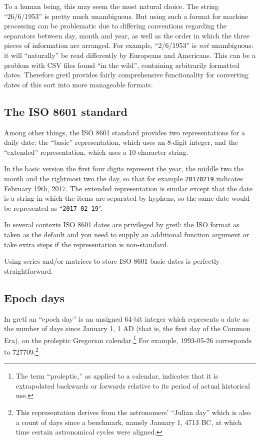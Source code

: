 To a human being, this may seem the most natural choice.  The string
``26/6/1953'' is pretty much unambiguous. But using such a format for
machine processing can be problematic due to differing conventions
regarding the separators between day, month and year, as well as the
order in which the three pieces of information are arranged.  For
example, ``2/6/1953'' is \textit{not} unambiguous: it will
``naturally'' be read differently by Europeans and Americans. This can
be a problem with CSV files found ``in the wild'', containing
arbitrarily formatted dates. Therefore gretl provides fairly
comprehensive functionality for converting dates of this sort into
more manageable formats.

\subsection{The ISO 8601 standard}
\label{sec:cal-ISO8601}

Among other things, the ISO 8601 standard provides two representations
for a daily date: the ``basic'' representation, which uses an 8-digit
integer, and the ``extended'' representation, which uses a
10-character string.

In the basic version the first four digits represent the year, the
middle two the month and the rightmost two the day, so that for
example \texttt{20170219} indicates February 19th, 2017. The extended
representation is similar except that the date is a string in which
the items are separated by hyphens, so the same date would be
represented as ``\texttt{2017-02-19}''.

In several contexts ISO 8601 dates are privileged by gretl: the ISO
format as taken as the default and you need to supply an additional
function argument or take extra steps if the representation is
non-standard.

Using series and/or matrices to store ISO 8601 basic dates is
perfectly straightforward.

\subsection{Epoch days}
\label{sec:cal-epochday}

In gretl an ``epoch day'' is an unsigned 64-bit integer which
represents a date as the number of days since January 1, 1 AD (that
is, the first day of the Common Era), on the proleptic Gregorian
calendar.\footnote{The term ``proleptic,'' as applied to a calendar,
  indicates that it is extrapolated backwards or forwards relative to
  its period of actual historical use.} For example, 1993-05-26
corresponds to 727709.\footnote{This representation derives from the
  astronomers' ``Julian day'' which is also a count of days since a
  benchmark, namely January 1, 4713 BC, at which time certain
  astronomical cycles were aligned.}

